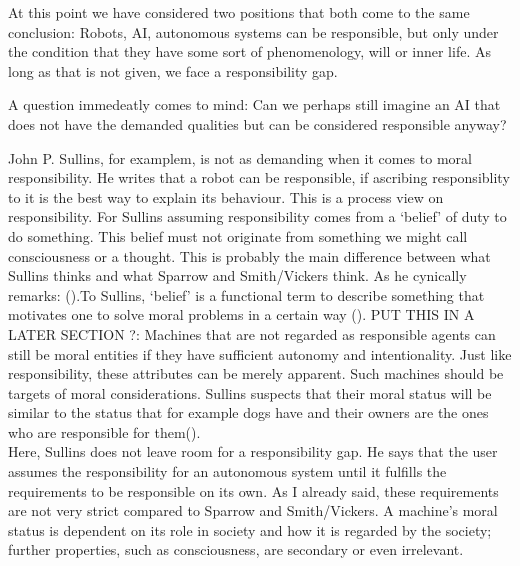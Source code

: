 \documentclass{article}
\newcounter{example}
\begin{document}
At this point we have considered two positions that both come to the same
conclusion: Robots, AI, autonomous systems can be responsible, but only under
the condition that they have some sort of phenomenology, will or inner life. As long
as that is not given, we face a responsibility gap.


A question immedeatly comes to mind: Can we perhaps still imagine an AI that
does not have the demanded qualities but can be considered responsible anyway?

John P. Sullins, for examplem, is not as demanding when it comes to moral responsibility. 
He writes that a robot can be responsible, if ascribing responsiblity to it
is the best way to explain its behaviour. This is a process view on
responsibility. For Sullins assuming responsibility
comes from a `belief' of duty to do something. This belief must not originate
from something we might call consciousness or a thought. This is probably the main
difference between what Sullins thinks and what Sparrow and Smith/Vickers think.
As he cynically remarks: (\cite[p. 159]{sullins2006robot}).To Sullins, `belief' is a
functional term to describe something that motivates one to solve moral problems
in a certain way (\cite[p. 159]{sullins2006robot}).
PUT THIS IN A LATER SECTION ?:
Machines that are not regarded as responsible agents can still be moral entities
if they have sufficient autonomy and intentionality. Just like responsibility,
these attributes can be merely apparent. Such machines should be targets of
moral considerations. Sullins suspects that their moral status will be similar
to the status that for example dogs have and their owners are the ones who are
responsible for them(\cite[p. 159]{sullins2006robot}).\\
Here, Sullins does not leave room for a responsibility gap. He says that the
user assumes the responsibility for an autonomous system until it fulfills the
requirements to be responsible on its own. As I already said, these requirements
are not very strict compared to Sparrow and Smith/Vickers. A machine's moral
status is dependent on its role in society and how it is regarded by the
society; further properties, such as consciousness, are secondary or even
irrelevant.
\end{document}
